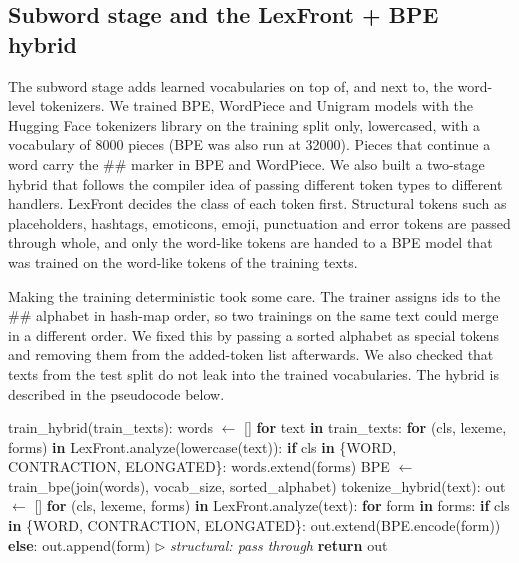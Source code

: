\documentclass[journal,a4paper]{IEEEtran}
\begin{document}
\subsection{Subword stage and the LexFront + BPE hybrid}\label{sec:3.6}
The subword stage adds learned vocabularies on top of, and next to, the word-level tokenizers. We trained BPE, WordPiece and Unigram models with the Hugging Face tokenizers library on the training split only, lowercased, with a vocabulary of 8000 pieces (BPE was also run at 32000). Pieces that continue a word carry the \#\# marker in BPE and WordPiece. We also built a two-stage hybrid that follows the compiler idea of passing different token types to different handlers. LexFront decides the class of each token first. Structural tokens such as placeholders, hashtags, emoticons, emoji, punctuation and error tokens are passed through whole, and only the word-like tokens are handed to a BPE model that was trained on the word-like tokens of the training texts.

Making the training deterministic took some care. The trainer assigns ids to the \#\# alphabet in hash-map order, so two trainings on the same text could merge in a different order. We fixed this by passing a sorted alphabet as special tokens and removing them from the added-token list afterwards. We also checked that texts from the test split do not leak into the trained vocabularies. The hybrid is described in the pseudocode below.

\begin{algorithm}[!tb]
\scriptsize
\caption{LexFront + BPE hybrid tokenizer}\label{alg:5}
\begin{algorithmic}[1]
\State train\_hybrid(train\_texts):
\State \hspace*{1.0em}words $\leftarrow$ []
\State \hspace*{1.0em}\textbf{for} text \textbf{in} train\_texts:
\State \hspace*{2.0em}\textbf{for} (cls, lexeme, forms) \textbf{in} LexFront.analyze(lowercase(text)):
\State \hspace*{3.0em}\textbf{if} cls \textbf{in} \{WORD, CONTRACTION, ELONGATED\}: words.extend(forms)
\State \hspace*{1.0em}BPE $\leftarrow$ train\_bpe(join(words), vocab\_size, sorted\_alphabet)
\State tokenize\_hybrid(text):
\State \hspace*{1.0em}out $\leftarrow$ []
\State \hspace*{1.0em}\textbf{for} (cls, lexeme, forms) \textbf{in} LexFront.analyze(text):
\State \hspace*{2.0em}\textbf{for} form \textbf{in} forms:
\State \hspace*{3.0em}\textbf{if} cls \textbf{in} \{WORD, CONTRACTION, ELONGATED\}:
\State \hspace*{4.0em}out.extend(BPE.encode(form))
\State \hspace*{3.0em}\textbf{else}:
\State \hspace*{4.0em}out.append(form) \hfill{\scriptsize$\triangleright$ \textit{structural: pass through}}
\State \hspace*{1.0em}\textbf{return} out
\end{algorithmic}
\end{algorithm}
\end{document}
